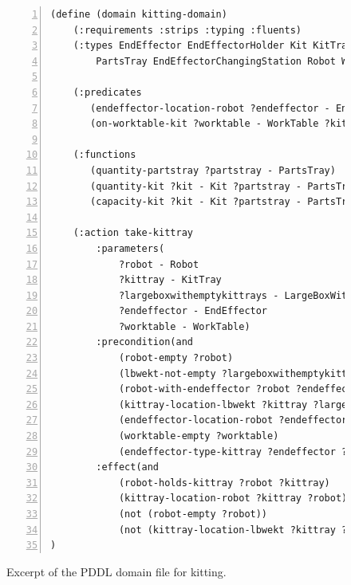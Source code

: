 \begin{figure}[t!h!]
\begin{minipage}{.5\paperwidth}
\begin{mylisting}
\begin{Verbatim}[commandchars=\\\{\},fontsize=\scriptsize, numbers=left, numbersep=2pt]
(define (domain kitting-domain)
    (:requirements :strips :typing :fluents)
    (:types EndEffector EndEffectorHolder Kit KitTray LargeBoxWithEmptyKitTrays 
        PartsTray EndEffectorChangingStation Robot WorkTable LargeBoxWithKits Part)

    (:predicates
	   (endeffector-location-robot ?endeffector - EndEffector ?robot - Robot)	
	   (on-worktable-kit ?worktable - WorkTable ?kit - Kit))

    (:functions
	   (quantity-partstray ?partstray - PartsTray)
	   (quantity-kit ?kit - Kit ?partstray - PartsTray)
	   (capacity-kit ?kit - Kit ?partstray - PartsTray))

    (:action take-kittray
        :parameters(
            ?robot - Robot
            ?kittray - KitTray
            ?largeboxwithemptykittrays - LargeBoxWithEmptyKitTrays
            ?endeffector - EndEffector
            ?worktable - WorkTable)
        :precondition(and
            (robot-empty ?robot)
            (lbwekt-not-empty ?largeboxwithemptykittrays)
            (robot-with-endeffector ?robot ?endeffector)
            (kittray-location-lbwekt ?kittray ?largeboxwithemptykittrays)
            (endeffector-location-robot ?endeffector ?robot)
            (worktable-empty ?worktable)
            (endeffector-type-kittray ?endeffector ?kittray))
        :effect(and
            (robot-holds-kittray ?robot ?kittray)
            (kittray-location-robot ?kittray ?robot)
            (not (robot-empty ?robot))
            (not (kittray-location-lbwekt ?kittray ?largeboxwithemptykittrays))))
)

\end{Verbatim}
\end{mylisting}
\end{minipage}
\caption{Excerpt of the PDDL domain file for kitting.}
\label{fig:domain}
\end{figure}

